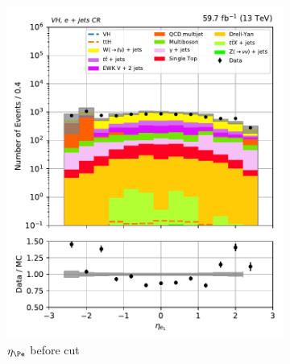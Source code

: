 \begin{figure}[htbp]
    \centering
    \begin{subfigure}[b]{0.34\textwidth}
        \includegraphics[width=\textwidth]{figures/hem_issue/region_3/leadLepton_eta/leadLepton_eta_VH_before.pdf}
        \caption{$\eta_{\Pe}$ before cut}
    \end{subfigure}
    \hspace{0.05\textwidth}
    \begin{subfigure}[b]{0.34\textwidth}

\end{subfigure}
\end{figure}
